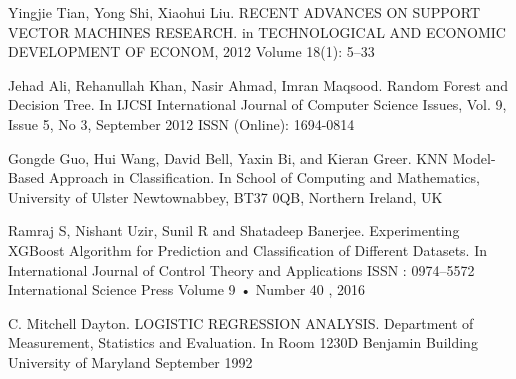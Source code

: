\begin{thebibliography}{9}
Yingjie Tian, Yong Shi, Xiaohui Liu. RECENT ADVANCES ON SUPPORT VECTOR MACHINES RESEARCH.  in TECHNOLOGICAL AND ECONOMIC DEVELOPMENT OF ECONOM, 2012  Volume 18(1): 5–33


Jehad Ali, Rehanullah Khan, Nasir Ahmad, Imran Maqsood. Random Forest and Decision Tree. In  IJCSI International Journal of Computer Science Issues, Vol. 9, Issue 5, No 3, September 2012 ISSN (Online): 1694-0814

Gongde Guo, Hui Wang, David Bell, Yaxin Bi, and Kieran Greer. KNN Model-Based Approach in Classification. In School of Computing and Mathematics, University of Ulster Newtownabbey, BT37 0QB, Northern Ireland, UK


Ramraj S, Nishant Uzir, Sunil R  and Shatadeep Banerjee. Experimenting XGBoost Algorithm for Prediction and Classification of Different Datasets. In International Journal of Control Theory and Applications ISSN : 0974–5572 International Science Press Volume 9  •  Number 40  , 2016

C. Mitchell Dayton. LOGISTIC REGRESSION ANALYSIS. Department of Measurement, Statistics and Evaluation.  In Room 1230D Benjamin Building University of Maryland September 1992

\end{thebibliography}